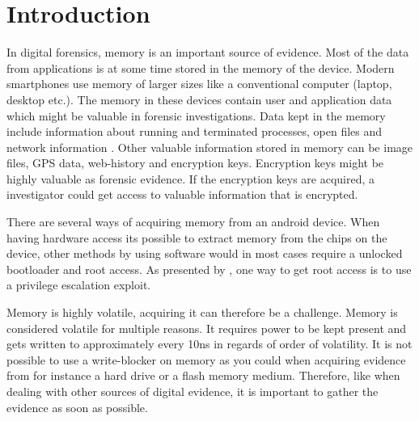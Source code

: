 \section{Introduction}


In digital forensics, memory is an important source of evidence. Most of the data from applications is at some time 
stored in the memory of the device. Modern smartphones use memory of larger sizes like a conventional computer (laptop, 
desktop etc.). The memory in these devices contain user and application data which might be valuable in forensic 
investigations. Data kept in the memory include information about running and terminated processes, open files and 
network information \cite{acq_vol_android_mem}. Other valuable information stored in memory can be image files, GPS data, 
web-history and encryption keys. Encryption keys might be highly valuable as forensic evidence. If the encryption keys 
are acquired, a investigator could get access to valuable information that is encrypted.

There are several ways of acquiring memory from an android device. When having hardware access its possible 
to extract memory from the chips on the device, other methods by using software would in most cases require 
a unlocked bootloader and root access. As presented by \cite{acq_vol_android_mem}, 
one way to get root access is to use a privilege escalation exploit. %




Memory is highly volatile, acquiring it can therefore be a challenge. Memory is considered volatile for multiple reasons. 
It requires  power to be kept present \cite{the_art_of_mem} and gets written to approximately every 10ns in regards of 
order of volatility. %
It is not possible to use a write-blocker on memory as you could when acquiring evidence from for instance a hard drive 
or a flash memory medium. Therefore, like when dealing with other sources of digital evidence, it is important to gather 
the evidence as soon as possible. 

